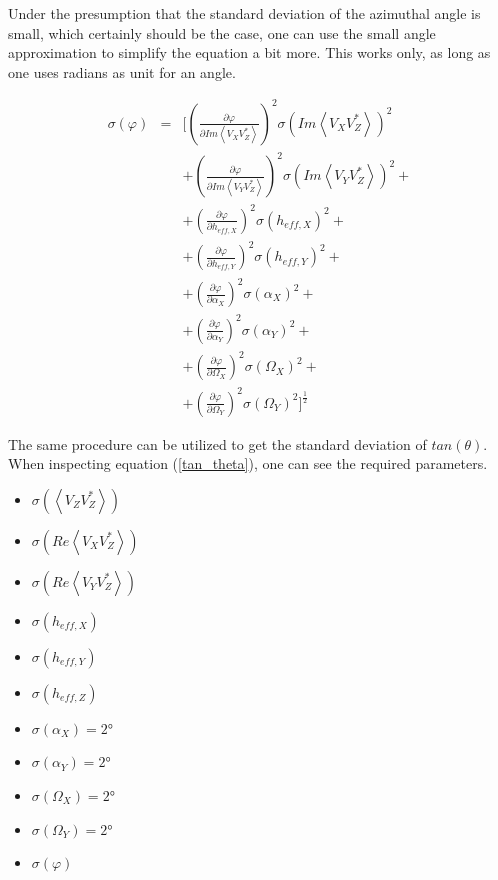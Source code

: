 \documentclass[a4paper,14pt]{extbook}
\begin{document}
Under the presumption that the standard deviation of the azimuthal angle is small, which certainly should be the case, one can use the small angle approximation to simplify the equation a bit more. This works only, as long as one uses radians as unit for an angle.

\begin{eqnarray}
\sigma (\varphi) &=&  [(\frac{\partial \varphi}{\partial Im \left\langle V_X V_Z^{*}\right\rangle})^2 \sigma (Im \left\langle V_X V_Z^{*}\right\rangle)^2\\
&&+ (\frac{\partial \varphi}{\partial Im \left\langle V_Y V_Z^{*}\right\rangle})^2 \sigma (Im \left\langle V_Y V_Z^{*}\right\rangle)^2 +\nonumber \\
&&+ (\frac{\partial \varphi}{\partial h_{eff,X}})^2 \sigma (h_{eff,X})^2 +\nonumber \\
&&+ (\frac{\partial \varphi}{\partial h_{eff,Y}})^2 \sigma (h_{eff,Y})^2 +\nonumber \\
&&+ (\frac{\partial \varphi}{\partial \alpha_X})^2 \sigma (\alpha_X)^2 +\nonumber \\
&&+ (\frac{\partial \varphi}{\partial \alpha_Y})^2 \sigma (\alpha_Y)^2 +\nonumber \\
&&+ (\frac{\partial \varphi}{\partial \Omega_X})^2 \sigma (\Omega_X)^2 +\nonumber \\
&&+ (\frac{\partial \varphi}{\partial \Omega_Y})^2 \sigma (\Omega_Y)^2]^\frac{1}{2} \nonumber
\end{eqnarray}

The same procedure can be utilized to get the standard deviation of $tan(\theta)$. When inspecting equation (\ref{tan_theta}), one can see the required parameters.
\newpage
\begin{itemize}
\item $\sigma (\left\langle V_Z V_Z^{*}\right\rangle)$
\item $\sigma (Re \left\langle V_X V_Z^{*}\right\rangle)$
\item $\sigma (Re \left\langle V_Y V_Z^{*}\right\rangle)$
\item $\sigma (h_{eff,X})$
\item $\sigma (h_{eff,Y})$
\item $\sigma (h_{eff,Z})$
\item $\sigma (\alpha_X)=2°$
\item $\sigma (\alpha_Y)=2°$
\item $\sigma (\Omega_X)=2°$
\item $\sigma (\Omega_Y)=2°$
\item $\sigma (\varphi)$
\end{itemize}
\end{document}
